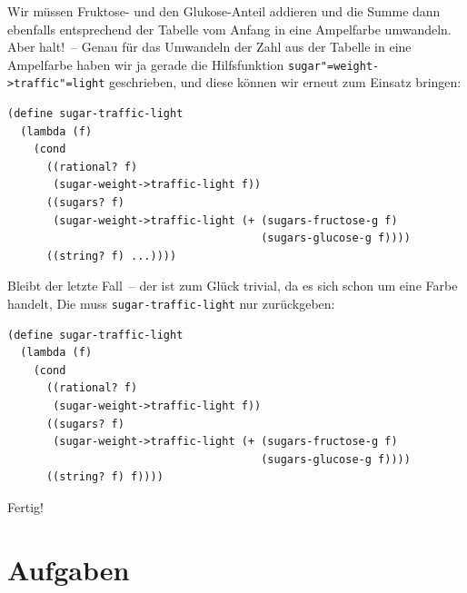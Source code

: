 %
Wir müssen Fruktose- und den Glukose-Anteil addieren und die Summe
dann ebenfalls entsprechend der Tabelle vom Anfang in eine Ampelfarbe
umwandeln.  Aber halt!~-- Genau für das Umwandeln der Zahl aus der
Tabelle in eine Ampelfarbe haben wir ja gerade die Hilfsfunktion
\texttt{sugar"=weight->traffic"=light} geschrieben, und diese können wir
erneut zum Einsatz bringen:
%
\begin{verbatim}
(define sugar-traffic-light
  (lambda (f)
    (cond
      ((rational? f)
       (sugar-weight->traffic-light f))
      ((sugars? f)
       (sugar-weight->traffic-light (+ (sugars-fructose-g f)
                                       (sugars-glucose-g f))))
      ((string? f) ...))))
\end{verbatim}         
%
Bleibt der letzte Fall~-- der ist zum Glück trivial, da es sich schon
um eine Farbe handelt, Die muss \texttt{sugar-traffic-light} nur
zurückgeben:
%
\begin{verbatim}
(define sugar-traffic-light
  (lambda (f)
    (cond
      ((rational? f)
       (sugar-weight->traffic-light f))
      ((sugars? f)
       (sugar-weight->traffic-light (+ (sugars-fructose-g f)
                                       (sugars-glucose-g f))))
      ((string? f) f))))
\end{verbatim}         
%
Fertig!

\section*{Aufgaben}

